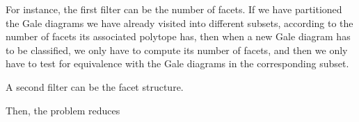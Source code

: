 \documentclass[11pt]{article}
\begin{document}
\begin{enumerate}
For instance, the first filter can be the number of facets. If we have partitioned the Gale diagrams we have already visited into different subsets, according to the number of facets its associated polytope has, then when a new Gale diagram has to be classified, we only have to compute its number of facets, and then we only have to test for equivalence with the Gale diagrams in the corresponding subset.

A second filter can be the facet structure.

Then, the problem reduces 
\end{enumerate}
\end{document}
